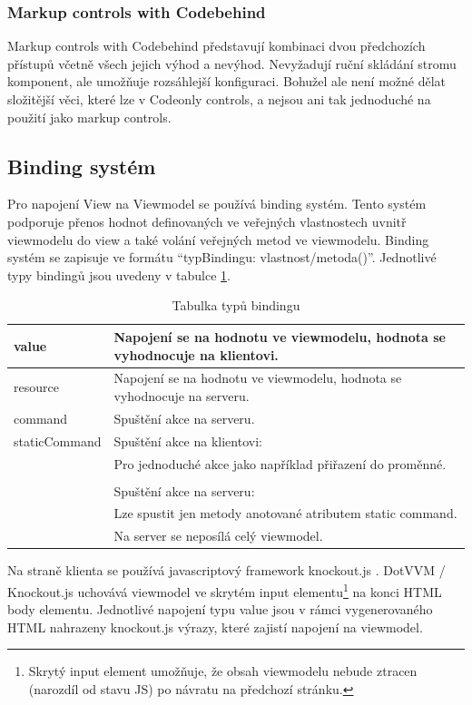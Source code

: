  \subsubsection{Markup controls with Codebehind}
 Markup controls with Codebehind představují kombinaci dvou předchozích přístupů včetně všech jejich výhod a nevýhod. Nevyžadují ruční skládání stromu komponent, ale umožňuje rozsáhlejší konfiguraci. Bohužel ale není možné dělat složitější věci, které lze v Codeonly controls, a nejsou ani tak jednoduché na použití jako markup controls.
 
\subsection*{Binding systém}
\label{DotVVMBinding}
Pro napojení View na Viewmodel se používá binding systém. Tento systém podporuje přenos hodnot definovaných ve veřejných vlastnostech uvnitř viewmodelu do view a také volání veřejných metod ve viewmodelu.
Binding systém se zapisuje ve formátu “{typBindingu: vlastnost/metoda()}”\cite{DotVVM-Binding}. Jednotlivé typy bindingů jsou uvedeny v tabulce \ref{tab: Tabulka typů bindingu}.

\begin{table}[H]
	\caption{Tabulka typů bindingu} 
	\centering
	\begin{tabular}{m{8em}|m{30em}}
		\toprule
		value & Napojení se na hodnotu ve viewmodelu, hodnota se vyhodnocuje na klientovi.\\ \midrule
		resource & Napojení se na hodnotu ve viewmodelu, hodnota se vyhodnocuje na serveru.\\ \midrule
		command & Spuštění akce na serveru.\\ \midrule
		staticCommand & Spuštění akce na klientovi: \\
		& Pro jednoduché akce jako například přiřazení do proměnné. \\\\
		& Spuštění akce na serveru: \\
		& Lze spustit jen metody anotované atributem static command. \\
		& Na server se neposílá celý viewmodel. \\

		\bottomrule
	\end{tabular}
	\label{tab: Tabulka typů bindingu}
\end{table}

Na straně klienta se používá javascriptový framework knockout.js . DotVVM / Knockout.js uchovává viewmodel ve skrytém input elementu\footnote{Skrytý input element umožňuje, že obsah viewmodelu nebude ztracen (narozdíl od stavu JS) po návratu na předchozí stránku.} na konci HTML body elementu. Jednotlivé napojení typu value jsou v rámci vygenerovaného HTML nahrazeny knockout.js výrazy, které zajistí napojení na viewmodel.

